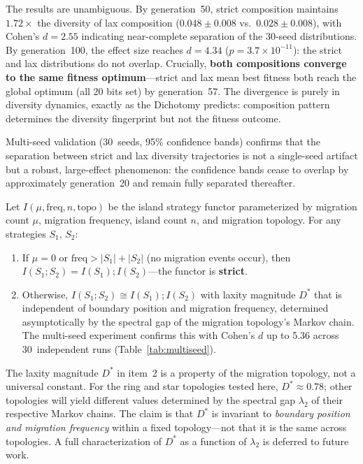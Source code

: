 \documentclass[sigconf]{acmart}
\begin{document}
The results are unambiguous. By generation~50, strict composition maintains $1.72\times$ the diversity of lax composition ($0.048 \pm 0.008$ vs.\ $0.028 \pm 0.008$), with Cohen's $d = 2.55$ indicating near-complete separation of the 30-seed distributions. By generation~100, the effect size reaches $d = 4.34$ ($p = 3.7 \times 10^{-11}$): the strict and lax distributions do not overlap. Crucially, \textbf{both compositions converge to the same fitness optimum}---strict and lax mean best fitness both reach the global optimum (all 20 bits set) by generation~57. The divergence is purely in diversity dynamics, exactly as the Dichotomy predicts: composition pattern determines the diversity fingerprint but not the fitness outcome.

Multi-seed validation (30~seeds, 95\% confidence bands) confirms that the separation between strict and lax diversity trajectories is not a single-seed artifact but a robust, large-effect phenomenon: the confidence bands cease to overlap by approximately generation~20 and remain fully separated thereafter.

\begin{observation}
\label{obs:dichotomy}
Let $I(\mu, \mathrm{freq}, n, \mathrm{topo})$ be the island strategy functor parameterized by migration count $\mu$, migration frequency, island count $n$, and migration topology. For any strategies $S_1$, $S_2$:
\begin{enumerate}[nosep]
  \item If $\mu = 0$ or $\mathrm{freq} > |S_1| + |S_2|$ (no migration events occur), then $I(S_1 ; S_2) = I(S_1) ; I(S_2)$---the functor is \textbf{strict}.
  \item Otherwise, $I(S_1 ; S_2) \cong I(S_1) ; I(S_2)$ with laxity magnitude $D^*$ that is independent of boundary position and migration frequency, determined asymptotically by the spectral gap of the migration topology's Markov chain. The multi-seed experiment confirms this with Cohen's $d$ up to 5.36 across 30~independent runs (Table~\ref{tab:multiseed}).
\end{enumerate}
\end{observation}

\begin{remark}
\label{rem:laxator-topo}
The laxity magnitude $D^*$ in item~2 is a property of the migration topology, not a universal constant. For the ring and star topologies tested here, $D^* \approx 0.78$; other topologies will yield different values determined by the spectral gap $\lambda_2$ of their respective Markov chains. The claim is that $D^*$ is invariant to \emph{boundary position and migration frequency} within a fixed topology---not that it is the same across topologies. A full characterization of $D^*$ as a function of $\lambda_2$ is deferred to future work.
\end{remark}
\end{document}
